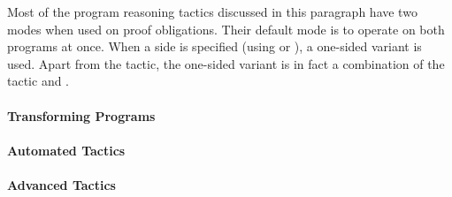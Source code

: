 Most of the program reasoning tactics discussed in this paragraph have
two modes when used on \prhl proof obligations. Their default mode is
to operate on both programs at once. When a side is specified (using
 or ), a one-sided variant is
used. Apart from the  tactic, the one-sided variant is in
fact a combination of the \phl tactic and .

\medskip












\paragraph{Transforming Programs}
















\paragraph{Automated Tactics}



\paragraph{Advanced Tactics}


